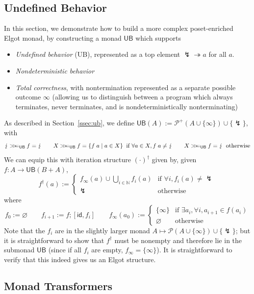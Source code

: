 \documentclass[acmsmall,screen,anonymous,review]{acmart}
\newcommand{\mc}[1]{\ensuremath{\mathcal{#1}}}
\newcommand{\ms}[1]{\ensuremath{\mathsf{#1}}}
\newcommand{\nats}{\mathbb{N}}
\newcommand{\tref}{\twoheadrightarrow}
\newcommand{\ubeff}{\lightning}
\newcommand{\obind}{\mathbin{>\!\!>\mkern-6.7mu=}}
\newcommand{\mbind}[3]{#2 \obind_{#1} #3}
\begin{document}
\subsection{Undefined Behavior}

\label{apx:ub}

In this section, we demonstrate how to build a more complex poset-enriched Elgot monad, by
constructing a monad $\ms{UB}$ which supports
\begin{itemize}
  \item \emph{Undefined behavior} (UB), represented as a top element $\ubeff \tref a$ for all $a$.
  \item \emph{Nondeterministic behavior}
  \item \emph{Total correctness}, with nontermination represented as a separate possible outcome
  $\infty$ (allowing us to distinguish between a program which always terminates, never terminates,
  and is nondeterministically nonterminating)
\end{itemize}
As described in Section~\ref{ssec:ub}, we define $\ms{UB}(A) := \mc{P}^+(A \cup \{\infty\}) \cup
\{\ubeff\}$, with
$$
\mbind{\ms{UB}}{\ubeff}{f} = \ubeff \qquad
\mbind{\ms{UB}}{X}{f} = \{f\;a \mid a \in X\} \;\; \text{if } \forall a \in X, f\;a \neq \ubeff
\qquad
\mbind{\ms{UB}}{X}{f} = \ubeff \;\; \text{otherwise}
$$
We can equip this with iteration structure $(\cdot)^\dagger$ given by, given $f : A \to \ms{UB}(B +
A)$,
$$
f^\dagger(a) := \begin{cases}
  f_\infty(a) \cup \bigcup_{i \in \nats}f_i(a) & \text{if } \forall i, f_i(a) \neq \ubeff
  \\
  \ubeff & \text{otherwise}
\end{cases}
$$
where
$$
f_0 := \varnothing \qquad
f_{i + 1} := f ; [\ms{id}, f_i] \qquad
f_\infty(a_0) := \begin{cases}
  \{\infty\} & \text{if } \exists a_i, \forall i, a_{i + 1} \in f(a_i)\\
  \varnothing & \text{otherwise}
\end{cases} 
$$
Note that the $f_i$ are in the slightly larger monad $A \mapsto \mc{P}(A \cup \{\infty\}) \cup
\{\ubeff\}$; but it is straightforward to show that $f^\dagger$ must be nonempty and therefore lie
in the submonad $\ms{UB}$ (since if all $f_i$ are empty, $f_\infty = \{\infty\}$). It is
straightforward to verify that this indeed gives us an Elgot structure.

\subsection{Monad Transformers}
\end{document}
